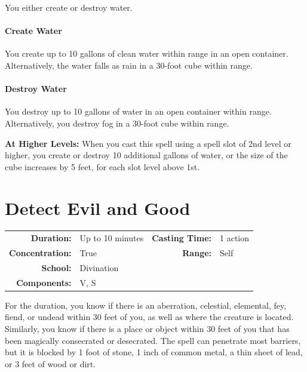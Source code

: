 \documentclass[12pt,showtrims]{memoir}
\begin{document}
\vspace{1\baselineskip}\noindent You either create or destroy water. \paragraph{Create Water} You create up to 10 gallons of clean water within range in an open container. Alternatively, the water falls as rain in a 30-foot cube within range. \paragraph{Destroy Water} You destroy up to 10 gallons of water in an open container within range. Alternatively, you destroy fog in a 30-foot cube within range.

\vspace{8pt} \noindent\textbf{At Higher Levels:} When you cast this spell using a spell slot of 2nd level or higher, you create or destroy 10 additional gallons of water, or the size of the cube increases by 5 feet, for each slot level above 1st.
\newpage
\section*{Detect Evil and Good}

{
\small\centering\vspace{-6pt}
\begin{tabular}{rlrl}
\toprule

\textbf{Duration:} & Up to 10 minutes &
\textbf{Casting Time:} & 1 action \\
\textbf{Concentration:} & True &
\textbf{Range:} & Self \\
\textbf{School:} & Divination \\
\textbf{Components:} & \multicolumn{3}{p{0.7\textwidth}}{V, S}\\

\bottomrule
\end{tabular}
}

\vspace{1\baselineskip}\noindent For the duration, you know if there is an aberration, celestial, elemental, fey, fiend, or undead within 30 feet of you, as well as where the creature is located. Similarly, you know if there is a place or object within 30 feet of you that has been magically consecrated or desecrated. The spell can penetrate most barriers, but it is blocked by 1 foot of stone, 1 inch of common metal, a thin sheet of lead, or 3 feet of wood or dirt.
\end{document}
